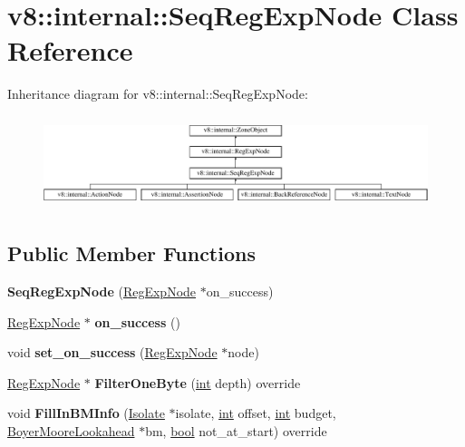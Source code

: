 \hypertarget{classv8_1_1internal_1_1SeqRegExpNode}{}\section{v8\+:\+:internal\+:\+:Seq\+Reg\+Exp\+Node Class Reference}
\label{classv8_1_1internal_1_1SeqRegExpNode}
Inheritance diagram for v8\+:\+:internal\+:\+:Seq\+Reg\+Exp\+Node\+:\begin{figure}[H]
\begin{center}
\leavevmode
\includegraphics[height=2.731707cm]{classv8_1_1internal_1_1SeqRegExpNode}
\end{center}
\end{figure}
\subsection*{Public Member Functions}
\begin{DoxyCompactItemize}
\item 
\mbox{\label{classv8_1_1internal_1_1SeqRegExpNode_ad6c7861c1161e0719546cb02c06879fd}} 
{\bfseries Seq\+Reg\+Exp\+Node} (\mbox{\hyperlink{classv8_1_1internal_1_1RegExpNode}{Reg\+Exp\+Node}} $\ast$on\+\_\+success)
\item 
\mbox{\label{classv8_1_1internal_1_1SeqRegExpNode_aade3ae76f2c2916714211c0742cfd739}} 
\mbox{\hyperlink{classv8_1_1internal_1_1RegExpNode}{Reg\+Exp\+Node}} $\ast$ {\bfseries on\+\_\+success} ()
\item 
\mbox{\label{classv8_1_1internal_1_1SeqRegExpNode_ac45d92508b35fc098a43ee36f46cac29}} 
void {\bfseries set\+\_\+on\+\_\+success} (\mbox{\hyperlink{classv8_1_1internal_1_1RegExpNode}{Reg\+Exp\+Node}} $\ast$node)
\item 
\mbox{\label{classv8_1_1internal_1_1SeqRegExpNode_a9f2bf8b0ece95e43c0d41ec93cab9b4b}} 
\mbox{\hyperlink{classv8_1_1internal_1_1RegExpNode}{Reg\+Exp\+Node}} $\ast$ {\bfseries Filter\+One\+Byte} (\mbox{\hyperlink{classint}{int}} depth) override
\item 
\mbox{\label{classv8_1_1internal_1_1SeqRegExpNode_a8e2c348bca85095b6d22cf754e998dfc}} 
void {\bfseries Fill\+In\+B\+M\+Info} (\mbox{\hyperlink{classv8_1_1internal_1_1Isolate}{Isolate}} $\ast$isolate, \mbox{\hyperlink{classint}{int}} offset, \mbox{\hyperlink{classint}{int}} budget, \mbox{\hyperlink{classv8_1_1internal_1_1BoyerMooreLookahead}{Boyer\+Moore\+Lookahead}} $\ast$bm, \mbox{\hyperlink{classbool}{bool}} not\+\_\+at\+\_\+start) override
\end{DoxyCompactItemize}

